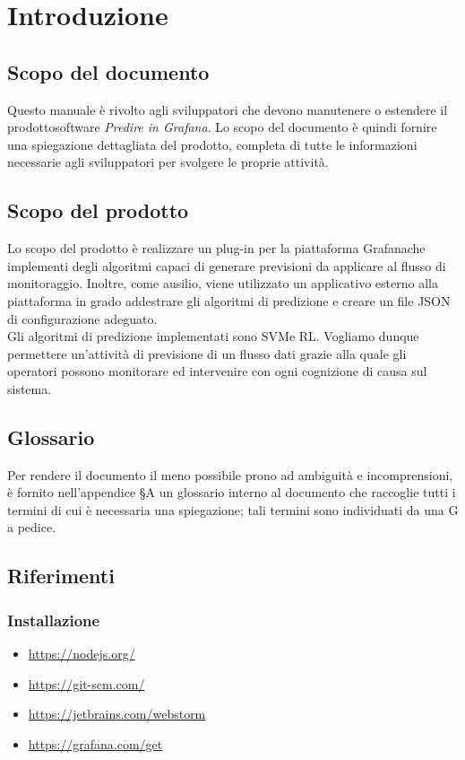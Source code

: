 \section{Introduzione}
\subsection{Scopo del documento}

Questo manuale è rivolto agli sviluppatori che devono manutenere o estendere il prodotto\glosp software \textit{Predire in Grafana}. Lo scopo del documento è quindi fornire una spiegazione dettagliata del prodotto\glo, completa di tutte le informazioni necessarie agli sviluppatori per svolgere le proprie attività.

\subsection{Scopo del prodotto}
Lo scopo del prodotto è realizzare un plug-in per la piattaforma Grafana\glosp che implementi degli algoritmi capaci di generare previsioni da applicare al flusso di monitoraggio. Inoltre, come ausilio, viene utilizzato un applicativo esterno alla piattaforma in grado addestrare gli algoritmi di predizione e creare un file JSON di configurazione adeguato. \\
Gli algoritmi di predizione implementati sono SVM\glosp e RL\glo.
Vogliamo dunque permettere un'attività di previsione di un flusso dati grazie alla quale gli operatori possono monitorare ed intervenire con ogni cognizione di causa sul sistema.

\subsection{Glossario}
Per rendere il documento il meno possibile prono ad ambiguità e incomprensioni, è fornito nell'appendice §A un glossario interno al documento che raccoglie tutti i termini di cui è necessaria una spiegazione; tali termini sono individuati da una G a pedice.
\subsection{Riferimenti}
\subsubsection{Installazione}
\begin{itemize}
	\item \url{https://nodejs.org/}
	\item \url{https://git-scm.com/}
	\item \url{https://jetbrains.com/webstorm}
	\item \url{https://grafana.com/get}
\end{itemize}
